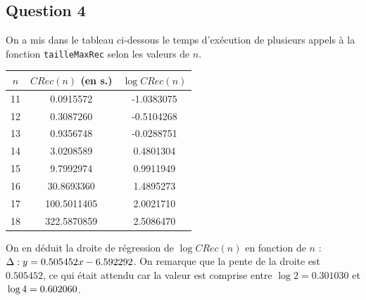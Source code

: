 \documentclass[12pt,a4paper]{article}
\begin{document}
\subsection*{Question 4}
On a mis dans le tableau ci-dessous le temps d'ex\'ecution de plusieurs appels \`a la fonction \texttt{tailleMaxRec} selon les valeurs de $n$.
	\begin{center}
	\begin{tabular}{|c|cc|}
	\hline $n$ & $CRec(n)$ (en s.) & $\log CRec(n)$ \\
	\hline 11 &   0.0915572 & -1.0383075 \\ 
	\hline 12 &   0.3087260 & -0.5104268 \\ 
	\hline 13 &   0.9356748 & -0.0288751 \\ 
	\hline 14 &   3.0208589 &  0.4801304 \\
	\hline 15 &   9.7992974 &  0.9911949 \\ 
	\hline 16 &  30.8693360 &  1.4895273 \\ 
	\hline 17 & 100.5011405 &  2.0021710 \\
	\hline 18 & 322.5870859 &  2.5086470 \\
	\hline
	\end{tabular}
	\end{center}
	
	On en d\'eduit la droite de r\'egression de $\log CRec(n)$ en fonction de $n$ : $\\\Delta : y = 0.505452x - 6.592292$. On remarque que la pente de la droite est $0.505452$, ce qui \'etait attendu car la valeur est comprise entre $\log 2 = 0.301030$ et $\\\log 4 = 0.602060$. 

\newpage
\end{document}
